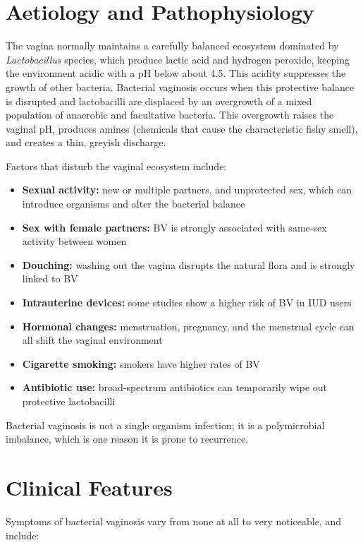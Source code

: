 \section*{Aetiology and Pathophysiology}
The vagina normally maintains a carefully balanced ecosystem dominated by \textit{Lactobacillus} species, which produce lactic acid and hydrogen peroxide, keeping the environment acidic with a pH below about 4.5. This acidity suppresses the growth of other bacteria. Bacterial vaginosis occurs when this protective balance is disrupted and lactobacilli are displaced by an overgrowth of a mixed population of anaerobic and facultative bacteria. This overgrowth raises the vaginal pH, produces amines (chemicals that cause the characteristic fishy smell), and creates a thin, greyish discharge.

Factors that disturb the vaginal ecosystem include:
\begin{itemize}
    \item \textbf{Sexual activity:} new or multiple partners, and unprotected sex, which can introduce organisms and alter the bacterial balance
    \item \textbf{Sex with female partners:} BV is strongly associated with same-sex activity between women
    \item \textbf{Douching:} washing out the vagina disrupts the natural flora and is strongly linked to BV
    \item \textbf{Intrauterine devices:} some studies show a higher risk of BV in IUD users
    \item \textbf{Hormonal changes:} menstruation, pregnancy, and the menstrual cycle can all shift the vaginal environment
    \item \textbf{Cigarette smoking:} smokers have higher rates of BV
    \item \textbf{Antibiotic use:} broad-spectrum antibiotics can temporarily wipe out protective lactobacilli
\end{itemize}

Bacterial vaginosis is not a single organism infection; it is a polymicrobial imbalance, which is one reason it is prone to recurrence.

\section*{Clinical Features}
Symptoms of bacterial vaginosis vary from none at all to very noticeable, and include:


